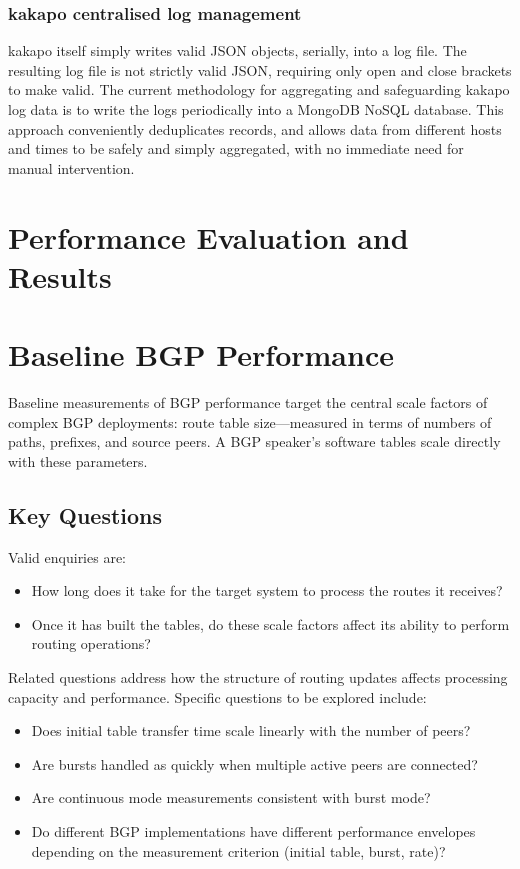 \subsubsection{kakapo centralised log management}
kakapo itself simply writes valid JSON objects, serially, into a log file.
The resulting log file is not strictly valid JSON, requiring only open and close brackets to make valid.
The current methodology for aggregating and safeguarding kakapo log data is to write the logs periodically into a MongoDB NoSQL database.
This approach conveniently deduplicates records, and allows data from different hosts and times to be safely and simply aggregated, with no immediate need for manual intervention.

\section{Performance Evaluation and Results}

\section{Baseline BGP Performance}

Baseline measurements of BGP performance target the central scale factors of complex BGP deployments: route table size---measured in terms of numbers of paths, prefixes, and source peers. A BGP speaker's software tables scale directly with these parameters.

\subsection{Key Questions}

Valid enquiries are:
\begin{itemize}
    \item How long does it take for the target system to process the routes it receives?
    \item Once it has built the tables, do these scale factors affect its ability to perform routing operations?
\end{itemize}

Related questions address how the structure of routing updates affects processing capacity and performance. Specific questions to be explored include:
\begin{itemize}
    \item Does initial table transfer time scale linearly with the number of peers?
    \item Are bursts handled as quickly when multiple active peers are connected?
    \item Are continuous mode measurements consistent with burst mode?
    \item Do different BGP implementations have different performance envelopes depending on the measurement criterion (initial table, burst, rate)?
\end{itemize}

